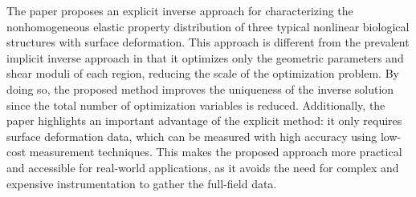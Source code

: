 \documentclass[11pt]{article}
\begin{document}
\noindent
The paper proposes an explicit inverse approach for
characterizing the nonhomogeneous elastic property distribution
of three typical nonlinear biological structures with surface
deformation. This approach is different from the prevalent
implicit inverse approach in that it optimizes only the
geometric parameters and shear moduli of each region, reducing
the scale of the optimization problem. By doing so, the proposed
method improves the uniqueness of the inverse solution since the
total number of optimization variables is reduced. Additionally,
the paper highlights an important advantage of the explicit
method: it only requires surface deformation data, which can be
measured with high accuracy using low-cost measurement
techniques. This makes the proposed approach more practical and
accessible for real-world applications, as it avoids the need
for complex and expensive instrumentation to gather the
full-field data.

\vspace{0.8em}
\end{document}
